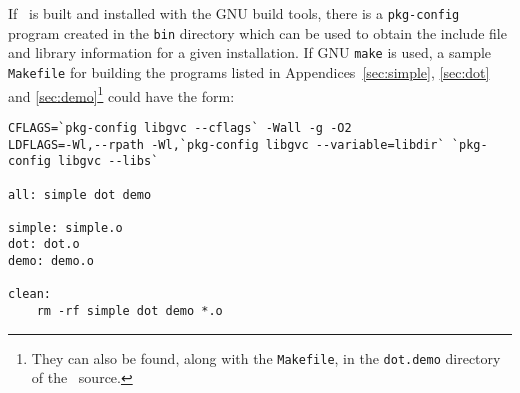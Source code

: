 If \gviz\ is built and installed with the GNU build tools, 
there is a {\tt pkg-config} program created in the {\tt bin} 
directory which can be used
to obtain the include file and library information for 
a given installation.
If GNU {\tt make} is used, a sample {\tt Makefile} for building the
programs listed in Appendices~\ref{sec:simple}, \ref{sec:dot} 
and \ref{sec:demo}\footnote{They
can also be found, along with the {\tt Makefile}, in the
{\tt dot.demo} directory of the \gviz\ source.}
could have the form:

\begin{verbatim}
CFLAGS=`pkg-config libgvc --cflags` -Wall -g -O2
LDFLAGS=-Wl,--rpath -Wl,`pkg-config libgvc --variable=libdir` `pkg-config libgvc --libs`

all: simple dot demo

simple: simple.o
dot: dot.o
demo: demo.o

clean:
    rm -rf simple dot demo *.o
\end{verbatim}

